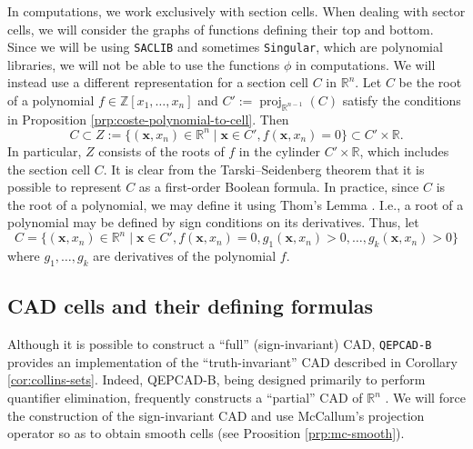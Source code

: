 \documentclass[
]{book}
\theoremstyle{definition}
\theoremstyle{definition}
\theoremstyle{definition}
\theoremstyle{definition}
\theoremstyle{remark}
\begin{document}
In computations, we work exclusively with section cells. When dealing with sector cells, we will consider the graphs of functions defining their top and bottom.
Since we will be using \texttt{SACLIB} and sometimes \texttt{Singular}, which are polynomial libraries, we will not be able to use the functions \(\phi\) in computations. We will instead use a different representation for a section cell \(C\) in \(\mathbb{R}^n\). Let \(C\) be the root of a polynomial \(f \in \mathbb{Z}[x_1,\ldots,x_n]\) and \(C' := {\operatorname{proj}_{\mathbb{R}^{n-1}}}(C)\) satisfy the conditions in Proposition \ref{prp:coste-polynomial-to-cell}. Then
\[
C \subset Z := \{ (\mathbf{x},x_n) \in \mathbb{R}^n \mid \mathbf{x} \in C', f(\mathbf{x},x_n) = 0 \} \subset C' \times \mathbb{R}.
\]
In particular, \(Z\) consists of the roots of \(f\) in the cylinder \(C' \times \mathbb{R}\), which includes the section cell \(C\). It is
clear from the Tarski--Seidenberg theorem that it is possible to represent \(C\) as a first-order Boolean formula. In practice, since \(C\) is the root of a polynomial, we may define it using Thom's Lemma \citep{costeRoyThomLemma}. I.e., a root of a polynomial may be defined by sign conditions on its derivatives. Thus, let
\[
C = \{ (\mathbf{x},x_n) \in \mathbb{R}^n \mid \mathbf{x} \in C', f(\mathbf{x},x_n) = 0, g_1(\mathbf{x},x_n) > 0, \ldots, g_k(\mathbf{x},x_n) > 0 \}
\]
where \(g_1,\ldots,g_k\) are derivatives of the polynomial \(f\).

\hypertarget{sec:cell-formula}{%
\subsection{CAD cells and their defining formulas}\label{sec:cell-formula}}

Although it is possible to construct a ``full'' (sign-invariant) CAD, \texttt{QEPCAD-B} provides an implementation of the ``truth-invariant'' CAD described in Corollary \ref{cor:collins-sets}. Indeed, QEPCAD-B, being designed primarily to perform quantifier elimination, frequently constructs a ``partial'' CAD of \(\mathbb{R}^n\) \citep{brownQepcad}.
We will force the construction of the sign-invariant CAD and use McCallum's projection operator so as to obtain smooth cells (see Proosition \ref{prp:mc-smooth}).
\end{document}
